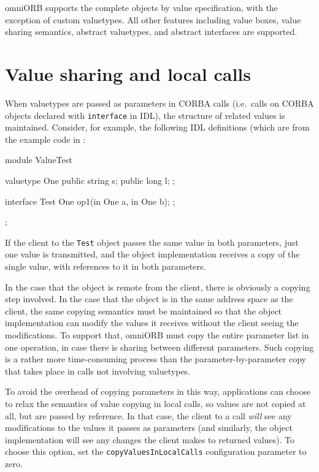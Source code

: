 \documentclass[11pt,oneside,a4paper]{book}
\newcommand{\type}[1]{\texttt{#1}}
\newcommand{\code}[1]{\texttt{#1}}
\begin{document}
omniORB supports the complete objects by value specification, with the
exception of custom valuetypes. All other features including value
boxes, value sharing semantics, abstract valuetypes, and abstract
interfaces are supported.


\section{Value sharing and local calls}

When valuetypes are passed as parameters in CORBA calls (i.e.\ calls
on CORBA objects declared with \code{interface} in IDL), the structure
of related values is maintained. Consider, for example, the following
IDL definitions (which are from the example code in
:

\begin{idllisting}
module ValueTest {
  valuetype One {
    public string s;
    public long   l;
  };

  interface Test {
    One op1(in One a, in One b);
  };
};
\end{idllisting}

If the client to the \type{Test} object passes the same value in both
parameters, just one value is transmitted, and the object
implementation receives a copy of the single value, with references to
it in both parameters.

In the case that the object is remote from the client, there is
obviously a copying step involved. In the case that the object is in
the same address space as the client, the same copying semantics must
be maintained so that the object implementation can modify the values
it receives without the client seeing the modifications. To support
that, omniORB must copy the entire parameter list in one operation, in
case there is sharing between different parameters. Such copying is a
rather more time-consuming process than the parameter-by-parameter
copy that takes place in calls not involving valuetypes.

To avoid the overhead of copying parameters in this way, applications
can choose to relax the semantics of value copying in local calls, so
values are not copied at all, but are passed by reference. In that
case, the client to a call \emph{will} see any modifications to the
values it passes as parameters (and similarly, the object
implementation will see any changes the client makes to returned
values). To choose this option, set the \code{copyValuesInLocalCalls}
configuration parameter to zero.
\end{document}
